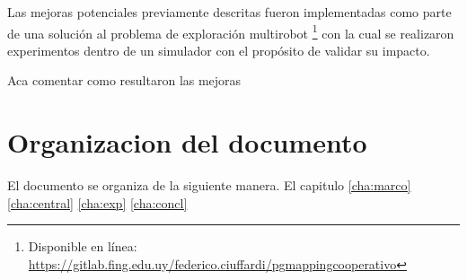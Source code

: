 
Las mejoras potenciales previamente descritas fueron implementadas como parte
de una solución al problema de exploración multirobot \footnote{Disponible en
línea:\\
\url{https://gitlab.fing.edu.uy/federico.ciuffardi/pgmappingcooperativo}} con
la cual se realizaron experimentos dentro de un simulador con el propósito de
validar su impacto.


Aca comentar  como resultaron las mejoras

\section{Organizacion del documento}
El documento se organiza de la siguiente manera.
El capitulo \ref{cha:marco} \ref{cha:central} \ref{cha:exp} \ref{cha:concl}


